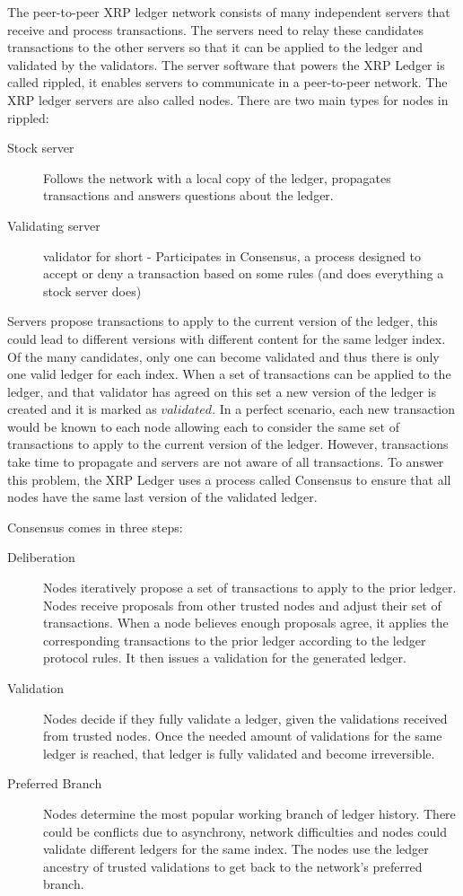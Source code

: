 The peer-to-peer XRP ledger network consists of many independent servers that receive and process transactions. The servers need to relay these candidates transactions to the other servers so that it can be applied to the ledger and validated by the validators. The server software that powers the XRP Ledger is called rippled\cite{rippled}, it enables servers to communicate in a peer-to-peer network.
The XRP ledger servers are also called nodes. There are two main types for nodes in rippled:
\begin{description}
\item[Stock server] Follows the network with a local copy of the ledger, propagates transactions and answers questions about the ledger.
\item[Validating server] validator for short - Participates in Consensus, a process designed to accept or deny a transaction based on some rules (and does everything a stock server does)
\end{description}
Servers propose transactions to apply to the current version of the ledger, this could lead to different versions with different content for the same ledger index. Of the many candidates, only one can become validated and thus there is only one valid ledger for each index. When a set of transactions can be applied to the ledger, and that validator has agreed on this set a new version of the ledger is created and it is marked as $validated$. In a perfect scenario, each new transaction would be known to each node allowing each to consider the same set of transactions to apply to the current version of the ledger. However, transactions take time to propagate and servers are not aware of all transactions. To answer this problem, the XRP Ledger uses a process called Consensus to ensure that all nodes have the same last version of the validated ledger.

Consensus comes in three steps:
\begin{description}
\item[Deliberation] Nodes iteratively propose a set of transactions to apply to the prior ledger. Nodes receive proposals from other trusted nodes and adjust their set of transactions. When a node believes enough proposals agree, it applies the corresponding transactions to the prior ledger according to the ledger protocol rules. It then issues a validation for the generated ledger.
\item[Validation] Nodes decide if they fully validate a ledger, given the validations received from trusted nodes. Once the needed amount of validations for the same ledger is reached, that ledger is fully validated and become irreversible.
\item[Preferred Branch] Nodes determine the most popular working branch of ledger history. There could be conflicts due to asynchrony, network difficulties and nodes could validate different ledgers for the same index. The nodes use the ledger ancestry of trusted validations to get back to the network’s preferred branch.
\end{description}